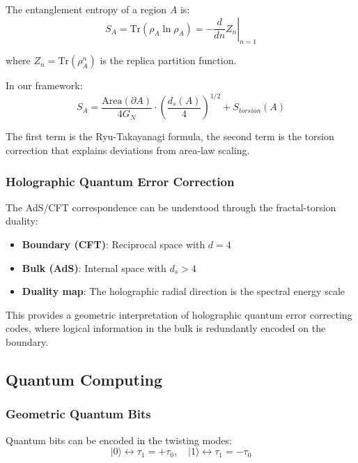 The entanglement entropy of a region $A$ is:
\begin{equation}
    S_A = \text{Tr}\left(\rho_A \ln \rho_A\right) = -\left.\frac{d}{dn}Z_n\right|_{n=1}
\end{equation}

where $Z_n = \text{Tr}(\rho_A^n)$ is the replica partition function.

In our framework:
\begin{equation}
    S_A = \frac{\text{Area}(\partial A)}{4G_N} \cdot \left(\frac{d_s(A)}{4}\right)^{1/2} + S_{torsion}(A)
\end{equation}

The first term is the Ryu-Takayanagi formula, the second term is the torsion correction that explains deviations from area-law scaling.

\subsubsection{Holographic Quantum Error Correction}

The AdS/CFT correspondence can be understood through the fractal-torsion duality:

\begin{itemize}
    \item \textbf{Boundary (CFT)}: Reciprocal space with $d = 4$
    \item \textbf{Bulk (AdS)}: Internal space with $d_s > 4$
    \item \textbf{Duality map}: The holographic radial direction is the spectral energy scale
\end{itemize}

This provides a geometric interpretation of holographic quantum error correcting codes, where logical information in the bulk is redundantly encoded on the boundary.

\subsection{Quantum Computing}

\subsubsection{Geometric Quantum Bits}

Quantum bits can be encoded in the twisting modes:
\begin{equation}
    |0\rangle \leftrightarrow \tau_1 = +\tau_0, \quad |1\rangle \leftrightarrow \tau_1 = -\tau_0
\end{equation}

